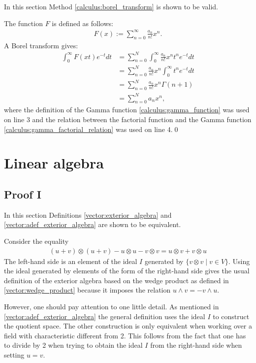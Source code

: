     In this section Method \ref{calculus:borel_transform} is shown to be valid.

    The function $F$ is defined as follows:
    \begin{gather}
        F(x) := \sum_{n=0}^\infty\frac{a_n}{n!}x^n.
    \end{gather}
    A Borel transform gives:
    \begin{align*}
        \int_0^\infty F(xt)e^{-t}dt&=\sum_{n=0}^N\int_0^\infty\frac{a_n}{n!}x^nt^ne^{-t}dt\\
        &=\sum_{n=0}^N\frac{a_n}{n!}x^n\int_0^\infty t^ne^{-t}dt\\
        &=\sum_{n=0}^N\frac{a_n}{n!}x^n\Gamma(n+1)\\
        &=\sum_{n=0}^Na_nx^n,
   \end{align*}
   where the definition of the Gamma function \ref{calculus:gamma_function} was used on line 3 and the relation between the factorial function and the Gamma function \eqref{calculus:gamma_factorial_relation} was used on line 4.\qed

\section{Linear algebra}
\subsection{Proof I}

    In this section Definitions \ref{vector:exterior_algebra} and \ref{vector:adef_exterior_algebra} are shown to be equivalent.

    Consider the equality
    \begin{gather}
        (u+v)\otimes(u+v) - u\otimes u - v\otimes v = u\otimes v + v\otimes u
    \end{gather}
    The left-hand side is an element of the ideal $I$ generated by $\{v\otimes v\mid v\in V\}$. Using the ideal generated by elements of the form of the right-hand side gives the usual definition of the exterior algebra based on the wedge product as defined in \ref{vector:wedge_product} because it imposes the relation $u\wedge v = -v\wedge u$.

    However, one should pay attention to one little detail. As mentioned in \ref{vector:adef_exterior_algebra} the general definition uses the ideal $I$ to construct the quotient space. The other construction is only equivalent when working over a field with characteristic different from 2. This follows from the fact that one has to divide by 2 when trying to obtain the ideal $I$ from the right-hand side when setting $u=v$.


